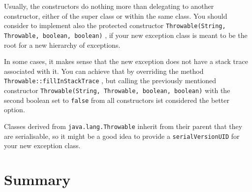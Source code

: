 Usually, the constructors do nothing more than delegating to another constructor, either of the super class or within the same class. You should consider to implement also the protected constructor \lstinline|Throwable(String, Throwable, boolean, boolean)| \autocite{ORACLE_DOC_THROWABLE:constructor4}, if your new exception class is meant to be the root for a new hierarchy of exceptions.

In some cases, it makes sense that the new exception does not have a stack trace associated with it. You can achieve that by overriding the method \lstinline|Throwable::fillInStackTrace| \autocite{ORACLE_DOC_THROWABLE:fillInStackTrace}, but calling the previously mentioned constructor \lstinline|Throwable(String, Throwable, boolean, boolean)| with the second boolean set to \lstinline|false| from all constructors ist considered the better option.

Classes derived from \lstinline|java.lang.Throwable| inherit from their parent that they are serialisable, so it might be a good idea to provide a \lstinline|serialVersionUID| \autocite{Baeldung:SerialVersionUID,ORACLE_DOC_OBJECT_SERIALIZATION_SPEC,WhatInDev:SerialVersionUID} for your new exception class. 

\section{Summary}

